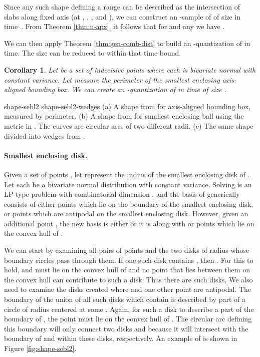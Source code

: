 \documentclass{journal}
\newtheorem {corollary}[theorem]{Corollary}
\begin{document}
Since any such shape defining a range  can be described as the intersection of  slabs along fixed axis (at , , , and ), we can construct an -sample  of  of size  in  time~\cite{Phi08}.  From Theorem \ref{thm:n-apx}, it follows that for  and any  we have .

We can then apply Theorem \ref{thm:gen-comb-dist} to build an -quantization of  in  time.  
The size can be reduced to  within that time bound. 

\begin{corollary}
Let  be a set of indecisive points where each  is bivariate normal with constant variance.  Let  measure the perimeter of the smallest enclosing axis-aligned bounding box.
We can create an -quantization of  in  time  of size .
\label{cor:n-apx-aabbp}
\end{corollary}


 {shape-sebl2} {shape-sebl2-wedges}
{
  (a) A shape from  for axis-aligned bounding box, measured by perimeter.  
  (b) A shape from  for smallest enclosing ball using the  metric in . The curves are circular arcs of two different radii. 
  (c) The same shape divided into wedges from .
}

\paragraph{Smallest enclosing disk.}
Given a set of points , let  represent the radius of the smallest enclosing disk of .  Let each  be a bivariate normal distribution with constant variance.  Solving  is an LP-type problem with combinatorial dimension , and the basis  of  generically consists of either  points which lie on the boundary of the smallest enclosing disk, or  points which are antipodal on the smallest enclosing disk.  However, given an additional point , the new basis  is either  or it is  along with  or  points which lie on the convex hull of .

We can start by examining all pairs of points  and the two disks of radius  whose boundary circles pass through them.  If one such disk  contains , then .  For this to hold,  and  must lie on the convex hull of  and no point that lies between them on the convex hull can contribute to such a disk.  Thus there are  such disks.
We also need to examine the disks created where  and one other point  are antipodal.  The boundary of the union of all such disks which contain  is described by part of a circle of radius  centered at some .  Again, for such a disk  to describe a part of the boundary of , the point  must lie on the convex hull of .  The circular arc defining this boundary will only connect two disks  and  because it will intersect with the boundary of  and  within these disks, respectively.  An example of  is shown in Figure \ref{fig:shape-sebl2}.
\end{document}
